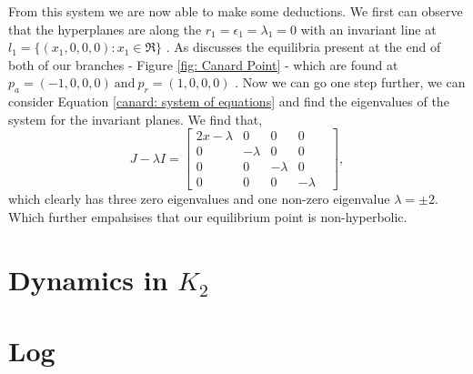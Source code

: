 \documentclass{article}
\begin{document}
From this system we are now able to make some deductions. We first can observe that the hyperplanes are along the $r_1=\epsilon_1=\lambda_1=0$ with an invariant line at $l_1=\{(x_1,0,0,0): x_1\in\Re\}$ \citep{krupa2001}. As \citet{krupa2001} discusses the equilibria present at the end of both of our branches - Figure \ref{fig: Canard Point} - which are found at $p_a=(-1,0,0,0) \ \text{and} \ p_r=(1,0,0,0)$ \citep{krupa2001}. Now we can go one step further, we can consider Equation \ref{canard: system of equations} and find the eigenvalues of the system for the invariant planes. We find that, 
\begin{equation}
    J-\lambda I= \begin{bmatrix}
    2x-\lambda & 0 & 0 & 0  \\
    0 & -\lambda & 0 & 0&\\
    0 & 0 & -\lambda & 0 \\
    0 & 0 & 0 & -\lambda
\end{bmatrix},
\end{equation}
which clearly has three zero eigenvalues and one non-zero eigenvalue $\lambda=\pm 2$. Which further empahsises that our equilibrium point is non-hyperbolic.  










\newpage
\appendix
\section{Dynamics in \texorpdfstring{$K_2$}{K2}}

\newpage


\nocite{strogatz2007nonlinear}
\appendix
\section{Log}
\end{document}
